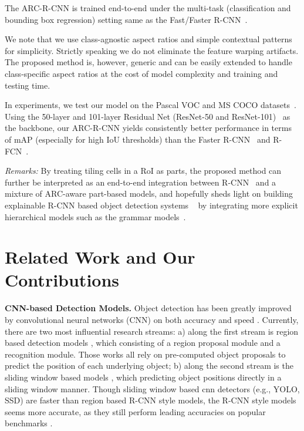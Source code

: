 \documentclass[10pt,twocolumn,letterpaper]{article}
\begin{document}
The ARC-R-CNN is trained end-to-end under the multi-task (classification and bounding box regression) setting same as the Fast/Faster R-CNN~\cite{fast_rcnn,faster_rcnn}. 


We note that we use class-agnostic aspect ratios and simple contextual patterns for simplicity. Strictly speaking we do not eliminate the feature warping artifacts. The proposed method is, however, generic and can be easily extended to handle class-specific aspect ratios at the cost of model complexity and training and testing time.

In experiments, we test our model on the Pascal VOC and MS COCO datasets~\cite{pascal}. Using the 50-layer and 101-layer Residual Net (ResNet-50 and ResNet-101)~\cite{resNet} as the backbone, our ARC-R-CNN yields consistently better performance in terms of mAP (especially for high IoU thresholds) than the Faster R-CNN~\cite{faster_rcnn} and R-FCN~\cite{rfcn}. 

\textit{Remarks:} By treating tiling cells in a RoI as parts, the proposed method can further be interpreted as an end-to-end integration between R-CNN~\cite{fast_rcnn,faster_rcnn} and a mixture of ARC-aware part-based models, and hopefully sheds light on building explainable R-CNN based object detection systems ~\cite{XAI} by integrating more explicit hierarchical models such as the grammar models~\cite{zhu_grammar,pff_grammar,carAOG,leozhu_nips07,DisAOT_CVPR2013}.

\vspace{-2mm}
\section{Related Work and Our Contributions}
 \vspace{-1mm}

\textbf{CNN-based Detection Models.}
Object detection has been greatly improved by convolutional neural networks (CNN) on both accuracy and speed \cite{szegedy_cvpr14,szegedy_nips13,rcnn, overfeat,rcnn,fast_rcnn,faster_rcnn,rfcn,yolo,ssd}. Currently, there are two most influential research streams: a) along the first stream is region based detection models \cite{rcnn,sppnet,fast_rcnn,faster_rcnn,rfcn}, which consisting of a region proposal module and a recognition module. Those works all rely on pre-computed object proposals to predict the position of each underlying object; b) along the second stream is the sliding window based models \cite{yolo,ssd}, which predicting object positions directly in a sliding window manner. Though sliding window based cnn detectors (e.g., YOLO, SSD) are faster than region based R-CNN style models, the R-CNN style models seems more accurate, as they still perform leading accuracies on popular benchmarks \cite{pascal,imagenet,coco}.
\end{document}
